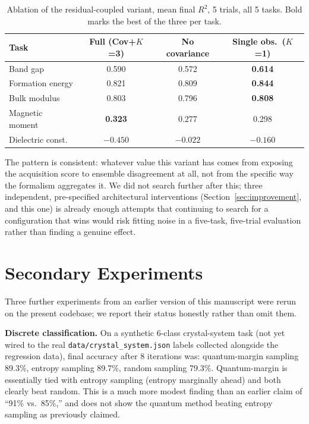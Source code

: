 \documentclass[conference]{IEEEtran}
\begin{document}
\begin{table}[!t]
\centering
\caption{Ablation of the residual-coupled variant, mean final $R^2$, 5 trials, all 5 tasks. Bold marks the best of the three per task.}
\label{tab:v3ablation}
\begin{tabular}{lccc}
\toprule
Task & Full (Cov+$K$=3) & No covariance & Single obs.\ ($K$=1) \\
\midrule
Band gap & 0.590 & 0.572 & \textbf{0.614} \\
Formation energy & 0.821 & 0.809 & \textbf{0.844} \\
Bulk modulus & 0.803 & 0.796 & \textbf{0.808} \\
Magnetic moment & \textbf{0.323} & 0.277 & 0.298 \\
Dielectric const. & $-0.450$ & \textbf{$-0.022$} & $-0.160$ \\
\bottomrule
\end{tabular}
\end{table}

The pattern is consistent: whatever value this variant has comes from exposing the acquisition score to ensemble disagreement at all, not from the specific way the formalism aggregates it. We did not search further after this; three independent, pre-specified architectural interventions (Section~\ref{sec:improvement}, and this one) is already enough attempts that continuing to search for a configuration that wins would risk fitting noise in a five-task, five-trial evaluation rather than finding a genuine effect.

\section{Secondary Experiments}

Three further experiments from an earlier version of this manuscript were rerun on the present codebase; we report their status honestly rather than omit them.

\textbf{Discrete classification.} On a synthetic 6-class crystal-system task (not yet wired to the real \texttt{data/crystal\_system.json} labels collected alongside the regression data), final accuracy after 8 iterations was: quantum-margin sampling 89.3\%, entropy sampling 89.7\%, random sampling 79.3\%. Quantum-margin is essentially tied with entropy sampling (entropy marginally ahead) and both clearly beat random. This is a much more modest finding than an earlier claim of ``91\% vs.\ 85\%,'' and does not show the quantum method beating entropy sampling as previously claimed.
\end{document}
